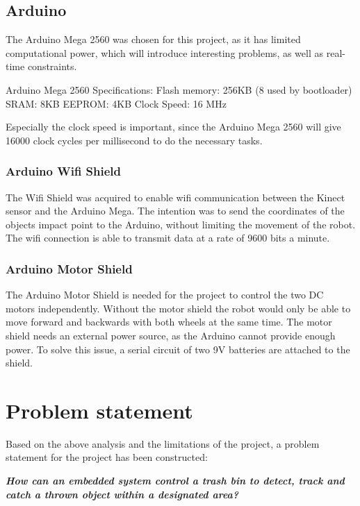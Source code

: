 \subsection{Arduino}
\label{sec:Arduino}
The Arduino Mega 2560 was chosen for this project, as it has limited computational power, which will introduce interesting problems, as well as real-time constraints. 

Arduino Mega 2560 Specifications:\newline
Flash memory: 256KB (8 used by bootloader)\newline
SRAM: 8KB\newline
EEPROM: 4KB\newline
Clock Speed: 16 MHz\newline

Especially the clock speed is important, since the Arduino Mega 2560 will give 16000 clock cycles per millisecond to do the necessary tasks.

\subsubsection{Arduino Wifi Shield}
\label{sec: Arduino Wifi Shield}
The Wifi Shield was acquired to enable wifi communication between the Kinect sensor and the Arduino Mega. The intention was to send the coordinates of the objects impact point to the Arduino, without limiting the movement of the robot. The wifi connection is able to transmit data at a rate of 9600 bits a minute. 
\citep{aws}

\subsubsection{Arduino Motor Shield}
\label{sec:Arduino Motor Shield}
The Arduino Motor Shield is needed for the project to control the two DC motors independently. Without the motor shield the robot would only be able to move forward and backwards with both wheels at the same time. 
The motor shield needs an external power source, as the Arduino cannot provide enough power. To solve this issue, a serial circuit of two 9V batteries are attached to the shield. \citep{ams}

\section{Problem statement}
\label{sec:Problem statement}
Based on the above analysis and the limitations of the project, a problem statement for the project has been constructed:

\textbf{\textit{How can an embedded system control a trash bin to detect, track and catch a thrown object within a designated area?}}
